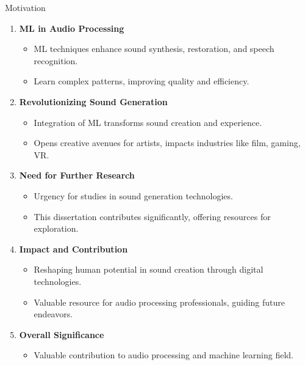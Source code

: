 \begin{frame}{Motivation}
    \begin{enumerate}
        \item \textbf{ML in Audio Processing}
              \begin{itemize}
                  \item ML techniques enhance sound synthesis, restoration, and speech recognition.
                  \item Learn complex patterns, improving quality and efficiency.
              \end{itemize}
        \item \textbf{Revolutionizing Sound Generation}
              \begin{itemize}
                  \item Integration of ML transforms sound creation and experience.
                  \item Opens creative avenues for artists, impacts industries like film, gaming, VR.
              \end{itemize}
        \item \textbf{Need for Further Research}
              \begin{itemize}
                  \item Urgency for studies in sound generation technologies.
                  \item This dissertation contributes significantly, offering resources for exploration.
              \end{itemize}
        \item \textbf{Impact and Contribution}
              \begin{itemize}
                  \item Reshaping human potential in sound creation through digital technologies.
                  \item Valuable resource for audio processing professionals, guiding future endeavors.
              \end{itemize}
        \item \textbf{Overall Significance}
              \begin{itemize}
                  \item Valuable contribution to audio processing and machine learning field.
              \end{itemize}
    \end{enumerate}
\end{frame}

